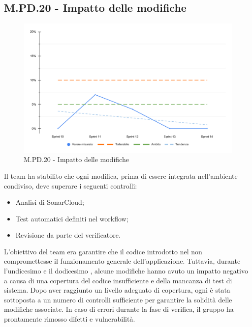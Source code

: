 \subsection{M.PD.20 - Impatto delle modifiche}

\begin{figure}[H]
  \centering
  \includegraphics[width=\textwidth]{assets/impatto_modifiche.pdf}
  \caption{M.PD.20 - Impatto delle modifiche}
\end{figure}

\par Il team ha stabilito che ogni modifica, prima di essere integrata nell'ambiente condiviso, deve superare i seguenti controlli:
\begin{itemize}
  \item Analisi di SonarCloud;
  \item Test automatici definiti nel workflow;
  \item Revisione da parte del verificatore.
\end{itemize}

\vspace{0.5\baselineskip}
\par L'obiettivo del team era garantire che il codice introdotto nel  non compromettesse il funzionamento generale dell'applicazione. Tuttavia, durante l'undicesimo e il dodicesimo , alcune modifiche hanno avuto un impatto negativo a causa di una copertura del codice insufficiente e della mancanza di test di sistema. Dopo aver raggiunto un livello adeguato di copertura, ogni  è stata sottoposta a un numero di controlli sufficiente per garantire la solidità delle modifiche associate. In caso di errori durante la fase di verifica, il gruppo ha prontamente rimosso difetti e vulnerabilità.